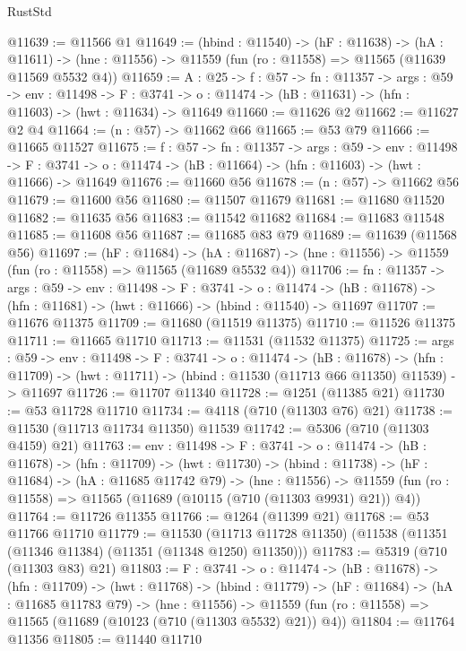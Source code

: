 \begin{lexlean}{RustStd}
\begin{coremodule}
@11639 := @11566 @1
@11649 := (hbind : @11540) ->
  (hF : @11638) ->
  (hA : @11611) -> (hne : @11556) -> @11559 (fun (ro : @11558) => @11565 (@11639 @11569 @5532 @4))
@11659 := {A : @25} ->
  {f : @57} ->
  {fn : @11357} ->
  {args : @59} ->
  {env : @11498} ->
  {F : @3741} -> {o : @11474} -> (hB : @11631) -> (hfn : @11603) -> (hwt : @11634) -> @11649
@11660 := @11626 @2
@11662 := @11627 @2 @4
@11664 := (n : @57) -> @11662 @66
@11665 := @53 @79
@11666 := @11665 @11527
@11675 := {f : @57} ->
  {fn : @11357} ->
  {args : @59} ->
  {env : @11498} ->
  {F : @3741} -> {o : @11474} -> (hB : @11664) -> (hfn : @11603) -> (hwt : @11666) -> @11649
@11676 := @11660 @56
@11678 := (n : @57) -> @11662 @56
@11679 := @11600 @56
@11680 := @11507 @11679
@11681 := @11680 @11520
@11682 := @11635 @56
@11683 := @11542 @11682
@11684 := @11683 @11548
@11685 := @11608 @56
@11687 := @11685 @83 @79
@11689 := @11639 (@11568 @56)
@11697 := (hF : @11684) ->
  (hA : @11687) -> (hne : @11556) -> @11559 (fun (ro : @11558) => @11565 (@11689 @5532 @4))
@11706 := {fn : @11357} ->
  {args : @59} ->
  {env : @11498} ->
  {F : @3741} ->
  {o : @11474} -> (hB : @11678) -> (hfn : @11681) -> (hwt : @11666) -> (hbind : @11540) -> @11697
@11707 := @11676 @11375
@11709 := @11680 (@11519 @11375)
@11710 := @11526 @11375
@11711 := @11665 @11710
@11713 := @11531 (@11532 @11375)
@11725 := {args : @59} ->
  {env : @11498} ->
  {F : @3741} ->
  {o : @11474} ->
  (hB : @11678) ->
  (hfn : @11709) -> (hwt : @11711) -> (hbind : @11530 (@11713 @66 @11350) @11539) -> @11697
@11726 := @11707 @11340
@11728 := @1251 (@11385 @21)
@11730 := @53 @11728 @11710
@11734 := @4118 (@710 (@11303 @76) @21)
@11738 := @11530 (@11713 @11734 @11350) @11539
@11742 := @5306 (@710 (@11303 @4159) @21)
@11763 := {env : @11498} ->
  {F : @3741} ->
  {o : @11474} ->
  (hB : @11678) ->
  (hfn : @11709) ->
  (hwt : @11730) ->
  (hbind : @11738) ->
  (hF : @11684) ->
  (hA : @11685 @11742 @79) ->
  (hne : @11556) ->
  @11559 (fun (ro : @11558) => @11565 (@11689 (@10115 (@710 (@11303 @9931) @21)) @4))
@11764 := @11726 @11355
@11766 := @1264 (@11399 @21)
@11768 := @53 @11766 @11710
@11779 := @11530
    (@11713 @11728 @11350)
    (@11538 (@11351 (@11346 @11384) (@11351 (@11348 @1250) @11350)))
@11783 := @5319 (@710 (@11303 @83) @21)
@11803 := {F : @3741} ->
  {o : @11474} ->
  (hB : @11678) ->
  (hfn : @11709) ->
  (hwt : @11768) ->
  (hbind : @11779) ->
  (hF : @11684) ->
  (hA : @11685 @11783 @79) ->
  (hne : @11556) ->
  @11559 (fun (ro : @11558) => @11565 (@11689 (@10123 (@710 (@11303 @5532) @21)) @4))
@11804 := @11764 @11356
@11805 := @11440 @11710

\end{coremodule}
\end{lexlean}
